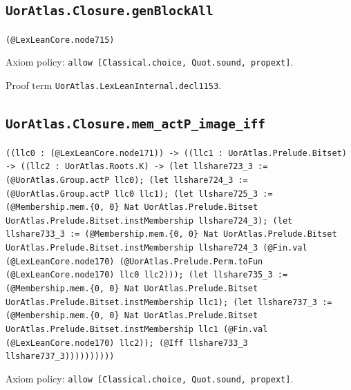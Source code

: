 \documentclass[11pt]{article}
\begin{document}
\subsection*{\texttt{UorAtlas.Closure.genBlockAll}}
\noindent\texttt{(@LexLeanCore.node715)}\par
\noindent Axiom policy: \texttt{allow [Classical.choice, Quot.sound, propext]}.\par
\noindent Proof term \texttt{UorAtlas.LexLeanInternal.decl1153}.\par
\subsection*{\texttt{UorAtlas.Closure.mem\_actP\_image\_iff}}
\noindent\texttt{((llc0 : (@LexLeanCore.node171)) -> ((llc1 : UorAtlas.Prelude.Bitset) -> ((llc2 : UorAtlas.Roots.K) -> (let llshare723\_3 := (@UorAtlas.Group.actP llc0); (let llshare724\_3 := (@UorAtlas.Group.actP llc0 llc1); (let llshare725\_3 := (@Membership.mem.\{0, 0\} Nat UorAtlas.Prelude.Bitset UorAtlas.Prelude.Bitset.instMembership llshare724\_3); (let llshare733\_3 := (@Membership.mem.\{0, 0\} Nat UorAtlas.Prelude.Bitset UorAtlas.Prelude.Bitset.instMembership llshare724\_3 (@Fin.val (@LexLeanCore.node170) (@UorAtlas.Prelude.Perm.toFun (@LexLeanCore.node170) llc0 llc2))); (let llshare735\_3 := (@Membership.mem.\{0, 0\} Nat UorAtlas.Prelude.Bitset UorAtlas.Prelude.Bitset.instMembership llc1); (let llshare737\_3 := (@Membership.mem.\{0, 0\} Nat UorAtlas.Prelude.Bitset UorAtlas.Prelude.Bitset.instMembership llc1 (@Fin.val (@LexLeanCore.node170) llc2)); (@Iff llshare733\_3 llshare737\_3))))))))))}\par
\noindent Axiom policy: \texttt{allow [Classical.choice, Quot.sound, propext]}.\par
\end{document}
